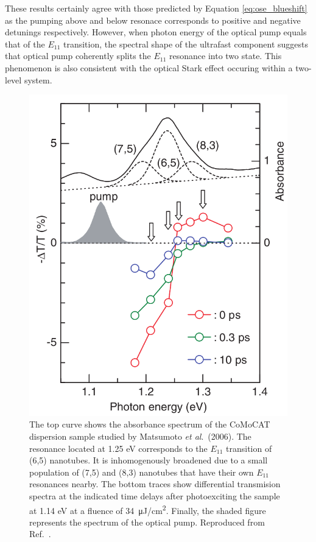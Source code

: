 These results certainly agree with those predicted by Equation \eqref{eq:ose_blueshift} as the pumping above and below resonace corresponds to positive and negative detunings respectively. However, when photon energy of the optical pump equals that of the $E_{11}$ transition, the spectral shape of the ultrafast component suggests that optical pump coherently splits the $E_{11}$ resonance into two state. This phenomenon is also consistent with the optical Stark effect occuring within a two-level system.

\begin{figure}[H]
	\centering
	\includegraphics[scale=1.25]{images/chapter_prior_works/abs_dtt_matsumoto}
	\caption{The top curve shows the absorbance spectrum of the CoMoCAT dispersion sample studied by Matsumoto \textit{et al}.\ (2006). The resonance located at 1.25 eV corresponds to the $E_{11}$ transition of (6,5) nanotubes. It is inhomogenously broadened due to a small population of (7,5) and (8,3) nanotubes that have their own $E_{11}$ resonances nearby. The bottom traces show differential transmision spectra at the indicated time delays after photoexciting the sample at 1.14 eV at a fluence of \SI{34}{\micro \joule / \cm\squared}. Finally, the shaded figure represents the spectrum of the optical pump. Reproduced from Ref.\ \cite{matsumoto2006optical}.}
	\label{fig:abs_dtt_matsumoto}
\end{figure}


